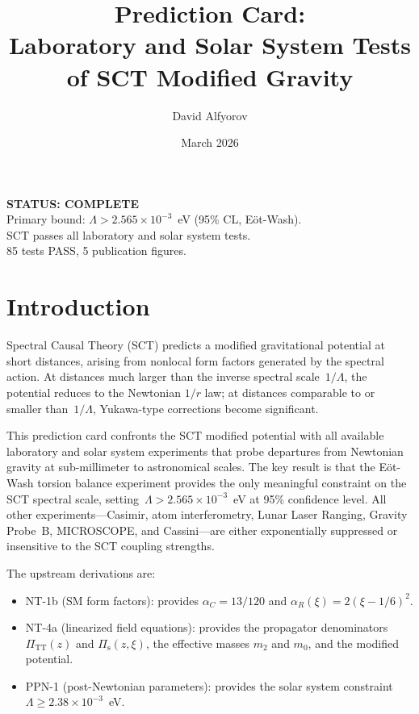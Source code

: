 \documentclass[11pt,a4paper]{article}
\title{%
  \textbf{Prediction Card:}\\[4pt]
  \Large Laboratory and Solar System Tests of SCT Modified Gravity
}
\author{David Alfyorov}
\date{March 2026}
\begin{document}
\maketitle

\begin{center}
\end{center}

\begin{center}
  \colorbox{statusgreen!10}{\parbox{0.82\textwidth}{\centering
    \textbf{\color{statusgreen} STATUS: COMPLETE}\\[2pt]
    \small Primary bound: $\Lambda > 2.565 \times 10^{-3}$~eV (95\% CL, E\"ot-Wash).\\
    SCT passes all laboratory and solar system tests.\\
    85 tests PASS, 5 publication figures.
  }}
\end{center}

\tableofcontents

\section{Introduction}
\label{sec:introduction}

Spectral Causal Theory (SCT) predicts a modified gravitational potential at
short distances, arising from nonlocal form factors generated by the spectral
action. At distances much larger than the inverse spectral scale~$1/\Lambda$,
the potential reduces to the Newtonian $1/r$ law; at distances comparable to
or smaller than~$1/\Lambda$, Yukawa-type corrections become significant.

This prediction card confronts the SCT modified potential with all available
laboratory and solar system experiments that probe departures from Newtonian
gravity at sub-millimeter to astronomical scales. The key result is that the
E\"ot-Wash torsion balance experiment provides the only meaningful constraint
on the SCT spectral scale, setting~$\Lambda > 2.565 \times 10^{-3}$~eV at
95\% confidence level. All other experiments---Casimir, atom interferometry,
Lunar Laser Ranging, Gravity Probe~B, MICROSCOPE, and Cassini---are either
exponentially suppressed or insensitive to the SCT coupling strengths.

The upstream derivations are:
\begin{itemize}[leftmargin=2em]
  \item NT-1b (SM form factors): provides $\alpha_C = 13/120$ and
    $\alpha_R(\xi) = 2(\xi - 1/6)^2$.
  \item NT-4a (linearized field equations): provides the propagator
    denominators $\Pi_{\mathrm{TT}}(z)$ and $\Pi_{\mathrm{s}}(z,\xi)$,
    the effective masses $m_2$ and $m_0$, and the modified potential.
  \item PPN-1 (post-Newtonian parameters): provides the solar system
    constraint $\Lambda \geq 2.38 \times 10^{-3}$~eV.
\end{itemize}
\end{document}
